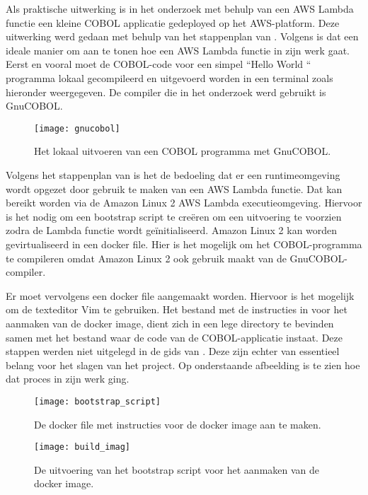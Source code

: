 \newpage

Als praktische uitwerking is in het onderzoek met behulp van een AWS Lambda functie een kleine COBOL applicatie gedeployed op het AWS-platform. Deze uitwerking werd gedaan met behulp van het stappenplan van \textcite{Paika2020}. Volgens \textcite{Paika2020} is dat een ideale manier om aan te tonen hoe een AWS Lambda functie in zijn werk gaat. Eerst en vooral moet de COBOL-code voor een simpel ``Hello World `` programma lokaal gecompileerd en uitgevoerd worden in een terminal zoals hieronder weergegeven. De compiler die in het onderzoek werd gebruikt is GnuCOBOL.  
    \begin{figure}[h]
        \centering
        \texttt{[image: gnucobol]}
        \caption{Het lokaal uitvoeren van een COBOL programma met GnuCOBOL.}
     \end{figure}
 
 \newpage
 
 Volgens het stappenplan van \textcite{Paika2020} is het de bedoeling dat er een runtimeomgeving wordt opgezet door gebruik te maken van een AWS Lambda functie. Dat kan bereikt worden via de Amazon Linux 2 AWS Lambda executieomgeving. Hiervoor is het nodig om een bootstrap script te creëren om een uitvoering te voorzien zodra de Lambda functie wordt geïnitialiseerd. Amazon Linux 2 kan worden gevirtualiseerd in een docker file. Hier is het mogelijk om het COBOL-programma te compileren omdat Amazon Linux 2 ook gebruik maakt van de  GnuCOBOL-compiler. 
 
 Er moet vervolgens een docker file aangemaakt worden. Hiervoor is het mogelijk om de texteditor Vim te gebruiken. Het bestand met de instructies in voor het aanmaken van de docker image, dient zich in een lege directory te bevinden samen met het bestand waar de code van de COBOL-applicatie instaat. Deze stappen werden niet uitgelegd in de gids van \textcite{Paika2020}. Deze zijn echter van essentieel belang voor het slagen van het project. Op onderstaande afbeelding is te zien hoe dat proces in zijn werk ging. 
 
  \begin{figure}[h]
     \centering
     \texttt{[image: bootstrap\_script]}
     \caption{De docker file met instructies voor de docker image aan te maken.}
 \end{figure}

  \begin{figure}[h]
    \centering
    \texttt{[image: build\_imag]}
    \caption{De uitvoering van het bootstrap script voor het aanmaken van de docker image.}
\end{figure}

